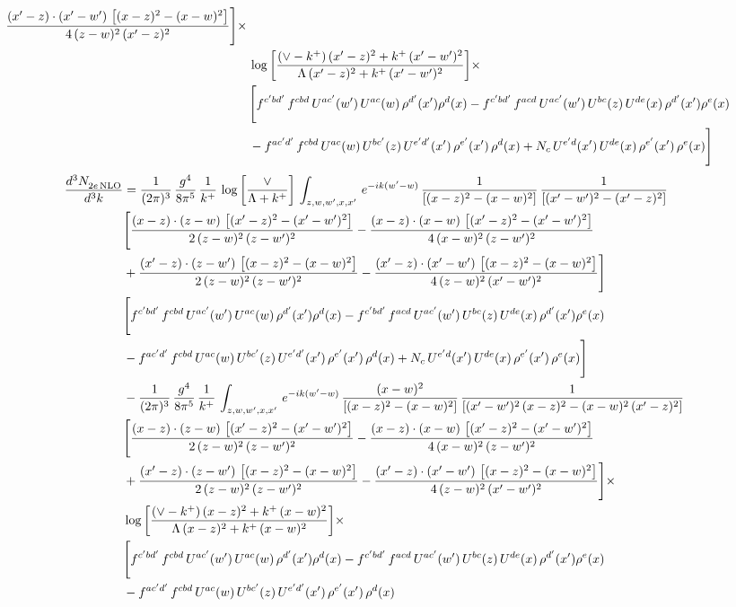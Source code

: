 \documentclass[9pt]{article}
\numberwithin{equation}{section}
\begin{document}
\begin{align}
\frac{(x'-z)\cdot (x'-w')\, \left[(x-z)^{2}-(x-w)^{2}\right]}{4\, (z-w)^{2}\,(x'-z)^{2}}\Bigg]\times\,\notag \\ & \log{\left[\frac{(\vee - k^{+})\, (x'-z)^{2} + k^{+}\, (x'-w')^{2}}{\Lambda\, (x'-z)^{2} + k^{+}\, (x'-w')^{2}}\right]} \times\notag \\ & \Bigg[f^{c'bd'}\,f^{cbd}\, U^{ac'}(w')\,U^{ac}(w)\,\rho^{d'}(x')\rho^{d}(x)- f^{c'bd'}\,f^{acd}\,U^{ac'}(w')\,U^{bc}(z)\,U^{de}(x)\,\rho^{d'}(x')\rho^{e}(x) \notag \\ & -f^{ac'd'}\,f^{cbd}\,U^{ac}(w)\,U^{bc'}(z)\,U^{e'd'}(x')\,\rho^{e'}(x')\,\rho^{d}(x) +N_{c}\,U^{e'd}(x')\,U^{de}(x)\,\rho^{e'}(x')\,\rho^{e}(x)\Bigg]
\end{align}
\begin{align}
 \frac{d^{3}N_{2e\,\rm NLO}^{\rm}}{d^{3}k}  & = \frac{1}{(2\pi)^{3}}\, \frac{g^{4}}{8\pi^{5}}\,\frac{1}{k^{+}}\,\log{\left[\frac{\vee}{\Lambda + k^{+}}\right]}\,\int_{z,w,w^{\prime},x,x'}\, e^{-ik(w^{\prime}-w)}\, \frac{1}{\left[(x-z)^{2}-(x-w)^{2}\right]}\, \frac{1}{\left[(x'-w')^{2} - (x'-z)^{2}\right]} \notag \\ & \Bigg[\frac{(x-z)\cdot (z-w)\, \left[(x'-z)^{2}-(x'-w')^{2}\right]}{2\, (z-w)^{2}\, (z-w')^{2}}  - \frac{(x-z)\cdot (x-w)\,\left[(x'-z)^{2}-(x'-w')^{2}\right] }{4\,(x-w)^{2}\,(z-w')^{2}}\notag \\ & +\frac{(x'-z)\cdot (z-w')\, \left[(x-z)^{2}-(x-w)^{2}\right]}{2\, (z-w)^{2}\, (z-w')^{2}}-\frac{(x'-z)\cdot (x'-w')\, \left[(x-z)^{2}-(x-w)^{2}\right]}{4\, (z-w)^{2}\,(x'-w')^{2}}\Bigg]\notag \\ & \Bigg[f^{c'bd'}\,f^{cbd}\, U^{ac'}(w')\,U^{ac}(w)\,\rho^{d'}(x')\rho^{d}(x)- f^{c'bd'}\,f^{acd}\,U^{ac'}(w')\,U^{bc}(z)\,U^{de}(x)\,\rho^{d'}(x')\rho^{e}(x) \notag \\ & -f^{ac'd'}\,f^{cbd}\,U^{ac}(w)\,U^{bc'}(z)\,U^{e'd'}(x')\,\rho^{e'}(x')\,\rho^{d}(x) +N_{c}\,U^{e'd}(x')\,U^{de}(x)\,\rho^{e'}(x')\,\rho^{e}(x)\Bigg]\notag \\ & -\frac{1}{(2\pi)^{3}}\, \frac{g^{4}}{8\pi^{5}}\,\frac{1}{k^{+}}\,\int_{z,w,w^{\prime},x,x'}\, e^{-ik(w^{\prime}-w)}\,\frac{(x-w)^{2}}{\left[(x-z)^{2}-(x-w)^{2}\right]}\, \frac{1}{\left[(x'-w')^{2}\, (x-z)^{2} - (x-w)^{2}\, (x'-z)^{2}\right]} \notag \\ & \Bigg[\frac{(x-z)\cdot (z-w)\, \left[(x'-z)^{2}-(x'-w')^{2}\right]}{2\, (z-w)^{2}\, (z-w')^{2}}  - \frac{(x-z)\cdot (x-w)\,\left[(x'-z)^{2}-(x'-w')^{2}\right] }{4\,(x-w)^{2}\,(z-w')^{2}}\notag \\ & +\frac{(x'-z)\cdot (z-w')\, \left[(x-z)^{2}-(x-w)^{2}\right]}{2\, (z-w)^{2}\, (z-w')^{2}}-\frac{(x'-z)\cdot (x'-w')\, \left[(x-z)^{2}-(x-w)^{2}\right]}{4\, (z-w)^{2}\,(x'-w')^{2}}\Bigg]\times\,\notag \\ & \log{\left[\frac{(\vee - k^{+})\, (x-z)^{2} + k^{+}\, (x-w)^{2}}{\Lambda\, (x-z)^{2} + k^{+}\, (x-w)^{2}}\right]}\times\,\notag \\ & \Bigg[f^{c'bd'}\,f^{cbd}\, U^{ac'}(w')\,U^{ac}(w)\,\rho^{d'}(x')\rho^{d}(x)- f^{c'bd'}\,f^{acd}\,U^{ac'}(w')\,U^{bc}(z)\,U^{de}(x)\,\rho^{d'}(x')\rho^{e}(x) \notag \\ & -f^{ac'd'}\,f^{cbd}\,U^{ac}(w)\,U^{bc'}(z)\,U^{e'd'}(x')\,\rho^{e'}(x')\,\rho^{d}(x) 
\end{align}
\end{document}
